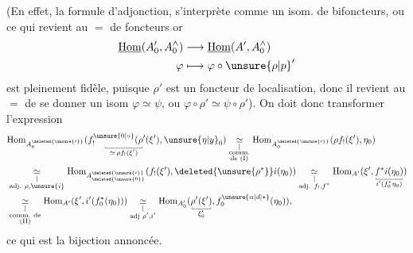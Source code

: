 (En effet, la formule d'adjonction, s'interprète comme un isom. de bifoncteurs, ou ce qui revient au $=$ de foncteurs
or
\[
 \begin{aligned}
 \underline{\mathrm{Hom}}(A'_0,A_0^{\wedge})&\longrightarrow\underline{\mathrm{Hom}}(A',A_0^{\wedge})\\
 \varphi&\longmapsto\varphi\circ\unsure{\rho|p}'
 \end{aligned}
\]
est pleinement fidèle, puisque $\rho'$ est un foncteur de localisation, donc il revient au $=$ de se donner un isom $\varphi\simeq\psi$, ou $\varphi\circ\rho'\simeq\psi\circ\rho'$). On doit donc transformer l'expression
\[
\begin{aligned}
 &\mathrm{Hom}_{A^{\deleted{\unsure{\prime}}}_0}(\underset{\substack{\rule{.35pt}{.4ex}\rule{4em}{.35pt}\rule{.35pt}{.4ex}\\\simeq\,\rho f_!(\xi')}}{f_!^{\unsure{0|\circ}}(\rho'(\xi')},\unsure{\eta|y}_0)
 \underset{\substack{\vert\\\text{comm.}\\\text{de (I)}}}{\simeq}\mathrm{Hom}_{A^{\deleted{\unsure{\prime}}}_0}(\rho f_!(\xi'),\eta_0)\\
 &\underset{\substack{\vert\\\text{adj. }\rho,\unsure{i}}}{\simeq}\mathrm{Hom}_{A_{\deleted{\unsure{0}}}^{\deleted{\unsure{\prime}}}}(f_!(\xi'),\deleted{\unsure{\rho^*}}i(\eta_0))
 \underset{\substack{\vert\\\text{adj. }f_!,f^*}}{\simeq}\mathrm{Hom}_{A'}(\xi',\underset{\substack{\rule{.35pt}{.4ex}\rule{2.8em}{.35pt}\rule{.35pt}{.4ex}\\i'(f_0^*\eta_0)}}{f^*i(\eta_0)})\\
 &\underset{\substack{\vert\\\text{comm. de}\\\text{(II)}}}{\simeq}\mathrm{Hom}_{A'}(\xi',i'(f_0^*(\eta_0)))
 \underset{\substack{\vert\\\text{adj }\rho',i'}}{\simeq}\mathrm{Hom}_{A'_0}(\underset{\substack{\rule{.35pt}{.4ex}\rule{2em}{.35pt}\rule{.35pt}{.4ex}\\\xi'_0}}{\rho'(\xi')},f_0^{\unsure{\alpha|d|*}}(\eta_0)),
\end{aligned}
\]
 ce qui est la bijection annoncée.

